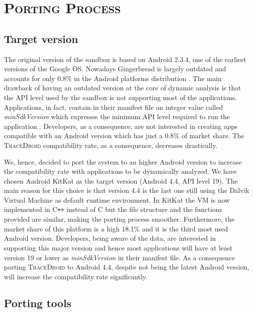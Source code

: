 \section{\textsc{Porting Process}}
\label{sec:porting_process}

\subsection{Target version}
\label{sec:target_version}

The original version of the sandbox is based on Android 2.3.4, one of
the earliest versions of the Google OS. Nowadays Gingerbread is
largely outdated and accounts for only 0.8\% in the Android platforms
distribution \cite{ref16}. The main drawback of having an outdated version at
the core of dynamic analysis is that the API level used by the sandbox
is not supporting most of the applications. Applications, in fact,
contain in their manifest file an integer value called \textit{minSdkVersion}
which expresses the minimum API level required to run the application
\cite{ref17}. Developers, as a consequence, are not interested in creating
apps compatible with an Android version which has just a 0.8\% of
market share. The \textsc{TraceDroid} compatibility rate, as a consequence,
decreases drastically.

We, hence, decided to port the system to an higher Android version to
increase the compatibility rate with applications to be dynamically
analyzed. We have chosen Android KitKat as the target version (Android
4.4, API level 19). The main reason for this choice is that version
4.4 is the last one still using the Dalvik Virtual Machine as default
runtime environment. In KitKat the VM is now implemented in
C{}\verb!++! instead of C but the file structure and the functions
provided are similar, making the porting process
smoother. Furthermore, the market share of this platform is a high
18.1\% and it is the third most used Android version. Developers,
being aware of the data, are interested in supporting this major
version and hence most applications will have at least version 19 or
lower as \textit{minSdkVersion} in their manifest file. As a
consequence porting \textsc{TraceDroid} to Android 4.4, despite not
being the latest Android version, will increase the compatibility rate
significantly.

\subsection{Porting tools}
\label{sec:porting_tools}

